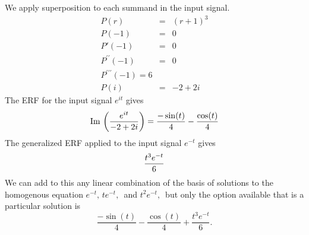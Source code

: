  We apply superposition to each summand in the input signal.
 \begin{eqnarray*}
   P(r) &=& (r+1)^3 \\
   P(-1) &=& 0 \\
   P'(-1) &=& 0 \\
   P^{\prime \prime}(-1) &=&  0 \\
   P^{\prime \prime \prime}(-1) = 6 \\
   P(i) &=& -2 + 2i
 \end{eqnarray*}
 The ERF for the input signal $e^{it}$ gives
 \begin{equation*}
   \displaystyle  \displaystyle \mathrm{Im\, }\left(\frac{e^{it}}{-2+2i}\right)
   \displaystyle =
   \displaystyle  \frac{-\sin (t)}{4}-\frac{\cos (t)}{4}
 \end{equation*}
 The generalized ERF applied to the input signal $e^{−t}$ gives
 \begin{equation*}
   \displaystyle  \displaystyle \frac{t^3e^{-t}}{6}
 \end{equation*}
 We can add to this any linear combination of the basis of solutions to the homogenous equation $e^{−t},\, te^{-t},\,$ and $t^2e^{-t},\,$
 but only the option available that is a particular solution is
 \begin{equation*}
   \frac{-\sin (t)}{4}-\frac{\cos (t)}{4}+\frac{t^3e^{-t}}{6}.
 \end{equation*}
 
\clearpage

